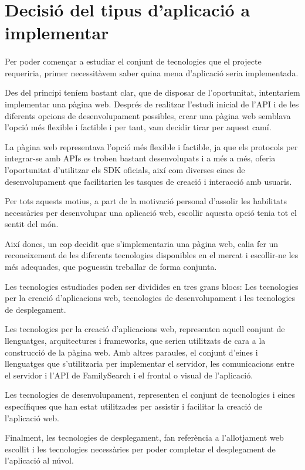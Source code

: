 \section{Decisió del tipus d'aplicació a implementar}

    \paragraph{}
    Per poder començar a estudiar el conjunt de tecnologies que el projecte requeriria, primer necessitàvem saber quina mena d'aplicació seria implementada.

    Des del principi teníem bastant clar, que de disposar de l’oportunitat, intentaríem implementar una pàgina web. Després de realitzar l’estudi inicial de l’API i de les diferents opcions de desenvolupament possibles, crear una pàgina web semblava l’opció més flexible i factible i per tant, vam decidir tirar per aquest camí.

    La pàgina web representava l’opció més flexible i factible, ja que els protocols per integrar-se amb APIs es troben bastant desenvolupats i a més a més, oferia l’oportunitat d’utilitzar els SDK oficials, així com diverses eines de desenvolupament que facilitarien les tasques de creació i interacció amb usuaris.

    Per tots aquests motius, a part de la motivació personal d’assolir les habilitats necessàries per desenvolupar una aplicació web, escollir aquesta opció tenia tot el sentit del món.

    Així doncs, un cop decidit que s'implementaria una pàgina web, calia fer un reconeixement de les diferents tecnologies disponibles en el mercat i escollir-ne les més adequades, que poguessin treballar de forma conjunta.

    Les tecnologies estudiades poden ser dividides en tres grans blocs: Les tecnologies per la creació d’aplicacions web, tecnologies de desenvolupament i les tecnologies de desplegament.

    Les tecnologies per la creació d’aplicacions web, representen aquell conjunt de llenguatges, arquitectures i frameworks, que serien utilitzats de cara a la construcció de la pàgina web. Amb altres paraules, el conjunt d’eines i llenguatges que s’utilitzaria per implementar el servidor, les comunicacions entre el servidor i l’API de FamilySearch i el frontal o visual de l’aplicació.

    Les tecnologies de desenvolupament, representen el conjunt de tecnologies i eines específiques que han estat utilitzades per assistir i facilitar la creació de l’aplicació web.

    Finalment, les tecnologies de desplegament, fan referència a l'allotjament web escollit i les tecnologies necessàries per poder completar el desplegament de l’aplicació al núvol.
